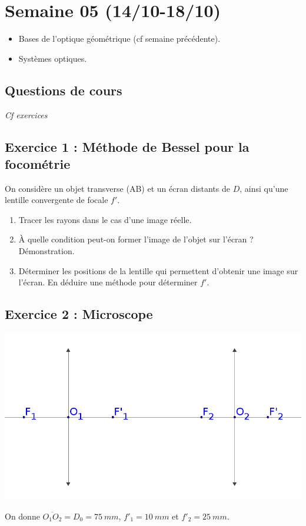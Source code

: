 \section{Semaine 05 (14/10-18/10) }


\begin{itemize}
	\item Bases de l'optique géométrique (cf semaine précédente).
	\item Systèmes optiques.
\end{itemize}

\subsection{Questions de cours}

\textit{Cf exercices}

\subsection{Exercice 1 : Méthode de Bessel pour la focométrie}

On considère un objet transverse (AB) et un écran distants de $D$, ainsi qu'une lentille convergente de focale $f'$.

\begin{enumerate}
	\item Tracer les rayons dans le cas d'une image réelle.
	\item À quelle condition peut-on former l'image de l'objet sur l'écran ? Démonstration.
	\item Déterminer les positions de la lentille qui permettent d'obtenir une image sur l'écran. En déduire une méthode pour déterminer $f'$.
\end{enumerate}

\subsection{Exercice 2 : Microscope}

\begin{minipage}[c]{\linewidth/2}
	\includegraphics[width=\textwidth]{./Images/mpsi_s05_ex02.png}
\end{minipage}%
\begin{minipage}[c]{\linewidth/2}
	On donne $\overline{O_1O_2} = D_0 = \SI{75}{mm}$, $f'_1 = \SI{10}{mm}$ et $f'_2 = \SI{25}{mm}$.
\end{minipage}
 
